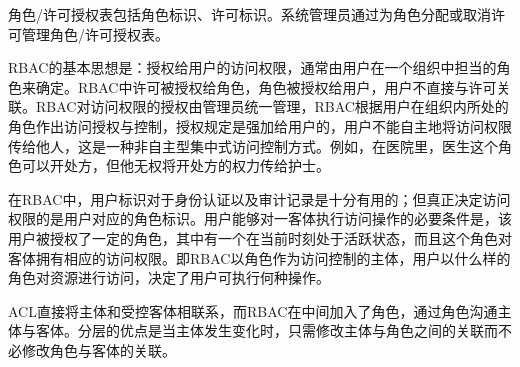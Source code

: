     角色/许可授权表包括角色标识、许可标识。系统管理员通过为角色分配或取消许可管理角色/许可授权表。

    RBAC的基本思想是：授权给用户的访问权限，通常由用户在一个组织中担当的角色来确定。RBAC中许可被授权给角色，角色被授权给用户，用户不直接与许可关联。RBAC对访问权限的授权由管理员统一管理，RBAC根据用户在组织内所处的角色作出访问授权与控制，授权规定是强加给用户的，用户不能自主地将访问权限传给他人，这是一种非自主型集中式访问控制方式。例如，在医院里，医生这个角色可以开处方，但他无权将开处方的权力传给护士。

    在RBAC中，用户标识对于身份认证以及审计记录是十分有用的；但真正决定访问权限的是用户对应的角色标识。用户能够对一客体执行访问操作的必要条件是，该用户被授权了一定的角色，其中有一个在当前时刻处于活跃状态，而且这个角色对客体拥有相应的访问权限。即RBAC以角色作为访问控制的主体，用户以什么样的角色对资源进行访问，决定了用户可执行何种操作。

    ACL直接将主体和受控客体相联系，而RBAC在中间加入了角色，通过角色沟通主体与客体。分层的优点是当主体发生变化时，只需修改主体与角色之间的关联而不必修改角色与客体的关联。
